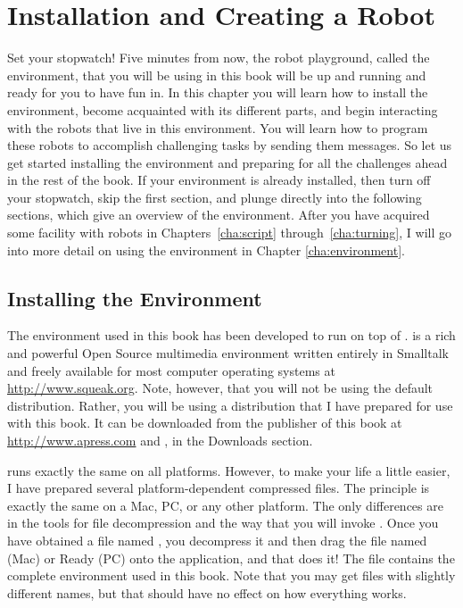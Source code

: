 \documentclass[a4paper,10pt,twoside]{book}
\begin{document}
    \sloppy
\fi

\chapter{Installation and Creating a Robot}\label{cha:installation}

Set your stopwatch! Five minutes from now, the robot playground, called the environment, 
that you will be using in this book will be up and running and ready for you to have fun in. In 
this chapter you will learn how to install the environment, become acquainted with its different parts, 
and begin interacting with the robots that live in this environment. You will learn 
how to program these robots to accomplish challenging tasks by sending them messages. 
So let us get started installing the environment and preparing for all the challenges ahead 
in the rest of the book. If your environment is already installed, then turn off your stopwatch, 
skip the first section, and plunge directly into the following sections, which give an overview 
of the environment. After you have acquired some facility with robots in Chapters~\ref{cha:script} through~\ref{cha:turning}, 
I will go into more detail on using the environment in Chapter \ref{cha:environment}. 


\newpage
\section{Installing the Environment}

The environment used in this book has been developed to run on top of \Squeak. \Squeak is a 
rich and powerful Open Source multimedia environment written entirely in Smalltalk and freely 
available for most computer operating systems at \url{http://www.squeak.org}. Note, however, that 
you will not be using the default \Squeak distribution. Rather, you will be using a distribution that 
I have prepared for use with this book. It can be downloaded from the publisher of this book at 
\url{http://www.apress.com} and , in the Downloads section. 

\Squeak runs exactly the same on all platforms. However, to make your life a little easier, I 
have prepared several platform-dependent compressed files. The principle is exactly the same 
on a Mac, PC, or any other platform. The only differences are in the tools for file decompression 
and the way that you will invoke \Squeak. Once you have obtained a file named , 
you decompress it and then drag the file named  (Mac) or Ready (PC) onto the 
\Squeak application, and that does it! The file  contains the complete environment 
used in this book. Note that you may get files with slightly different names, but that 
should have no effect on how everything works. 
\end{document}
